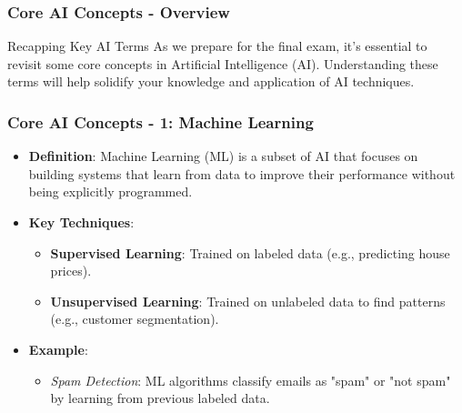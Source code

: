 \documentclass{beamer}
\begin{document}
\begin{frame}[fragile]
    \frametitle{Core AI Concepts - Overview}
    \begin{block}{Recapping Key AI Terms}
        As we prepare for the final exam, it's essential to revisit some core concepts in Artificial Intelligence (AI). 
        Understanding these terms will help solidify your knowledge and application of AI techniques.
    \end{block}
\end{frame}

\begin{frame}[fragile]
    \frametitle{Core AI Concepts - 1: Machine Learning}
    \begin{itemize}
        \item \textbf{Definition}: Machine Learning (ML) is a subset of AI that focuses on building systems that learn from data to improve their performance without being explicitly programmed.
        
        \item \textbf{Key Techniques}:
        \begin{itemize}
            \item \textbf{Supervised Learning}: Trained on labeled data (e.g., predicting house prices).
            \item \textbf{Unsupervised Learning}: Trained on unlabeled data to find patterns (e.g., customer segmentation).
        \end{itemize}
        
        \item \textbf{Example}: 
        \begin{itemize}
            \item \textit{Spam Detection}: ML algorithms classify emails as "spam" or "not spam" by learning from previous labeled data.
        \end{itemize}
    \end{itemize}
\end{frame}
\end{document}
